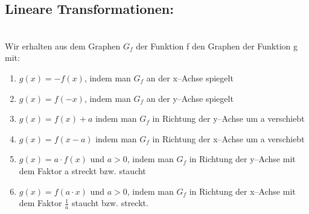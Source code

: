 \documentclass[a4paper,twocolumn,10pt]{onepgnote1}
\begin{document}
\subsection{Lineare Transformationen:}\\
Wir erhalten aus dem Graphen $G_f$ der Funktion f den Graphen der Funktion g mit:\\
\begin{enumerate}
    \item $g(x) = - f(x)$, indem man $G_f$ an der x--Achse spiegelt\\
\item $g(x) =f(-x)$, indem man $G_f$ an der y--Achse spiegelt\\
\item $g(x) = f(x) +a$ indem man $G_f$ in Richtung der y--Achse um a verschiebt\\
\item $g(x) =f(x-a)$ indem man $G_f$ in Richtung der x--Achse um a verschiebt\\
\item $g(x) =a\cdot f(x)$ und $a>0$, indem man $G_f$ in Richtung der y--Achse mit dem Faktor a streckt bzw. staucht\\
\item $g(x) =f(a\cdot x)$ und  $a>0$, indem man $G_f$ in Richtung der x--Achse mit dem Faktor $\frac{1}{a}$ staucht bzw. streckt.\\

\end{enumerate}
\end{document}
